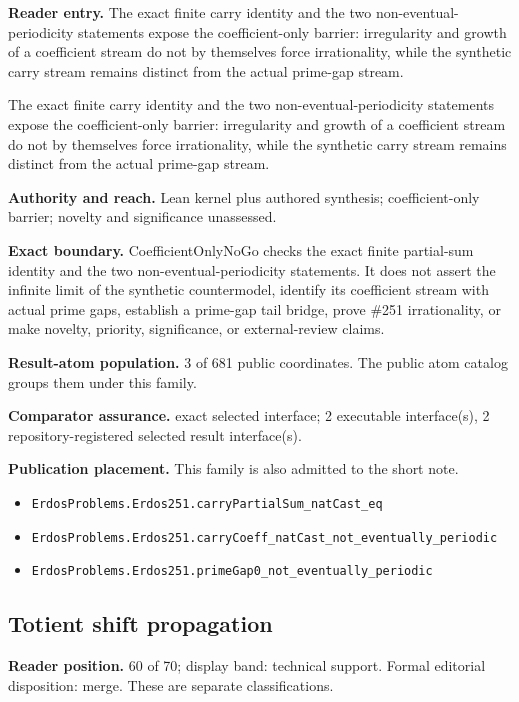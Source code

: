 \documentclass[11pt]{article}
\begin{document}
\textbf{Reader entry.} The exact finite carry identity and the two non-eventual-periodicity statements expose the coefficient-only barrier: irregularity and growth of a coefficient stream do not by themselves force irrationality, while the synthetic carry stream remains distinct from the actual prime-gap stream.

The exact finite carry identity and the two non-eventual-periodicity statements expose the coefficient-only barrier: irregularity and growth of a coefficient stream do not by themselves force irrationality, while the synthetic carry stream remains distinct from the actual prime-gap stream.

\textbf{Authority and reach.} Lean kernel plus authored synthesis; coefficient-only barrier; novelty and significance unassessed.

\textbf{Exact boundary.} CoefficientOnlyNoGo checks the exact finite partial-sum identity and the two non-eventual-periodicity statements. It does not assert the infinite limit of the synthetic countermodel, identify its coefficient stream with actual prime gaps, establish a prime-gap tail bridge, prove \#251 irrationality, or make novelty, priority, significance, or external-review claims.

\textbf{Result-atom population.} 3 of 681 public coordinates. The public atom catalog groups them under this family.

\textbf{Comparator assurance.} exact selected interface; 2 executable interface(s), 2 repository-registered selected result interface(s).

\textbf{Publication placement.} This family is also admitted to the short note.

\begin{itemize}
  \item \nolinkurl{ErdosProblems.Erdos251.carryPartialSum_natCast_eq}
  \item \nolinkurl{ErdosProblems.Erdos251.carryCoeff_natCast_not_eventually_periodic}
  \item \nolinkurl{ErdosProblems.Erdos251.primeGap0_not_eventually_periodic}
\end{itemize}

\subsection{Totient shift propagation}
\textbf{Reader position.} 60 of 70; display band: technical support.  Formal editorial disposition: merge.  These are separate classifications.
\end{document}
